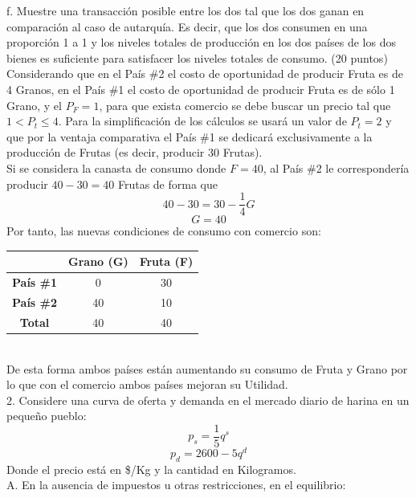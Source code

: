 \documentclass[12pt,dvipsnames]{article}
\begin{document}
f.	Muestre una transacción posible entre los dos tal que los dos ganan en comparación al caso de autarquía. Es decir, que los dos consumen en una proporción 1 a 1 y los niveles totales de producción en los dos países de los dos bienes es suficiente para satisfacer los niveles totales de consumo. (20 puntos)	\\

Considerando que en el País \#2 el costo de oportunidad de producir Fruta es de 4 Granos, en el País \#1 el costo de oportunidad de producir Fruta es de sólo 1 Grano, y  el $P_F = 1$, para que exista comercio se debe buscar un precio tal que $1 < P_t \leq 4$. Para la simplificación de los cálculos se usará un valor de $P_t = 2$ y que por la ventaja comparativa el País \#1 se dedicará exclusivamente a la producción de Frutas (es decir, producir 30 Frutas).\\
Si se considera la canasta de consumo donde $F = 40$, al País \#2 le correspondería producir $40 -30 = 40$ Frutas de forma que
$$40 - 30 = 30 - \frac{1}{4}G$$
$$G = 40$$ 
Por tanto, las nuevas condiciones de consumo con comercio son:\\
\begin{table}[h]
	\centering	
	\begin{tabular}{ccc}
		& \textbf{Grano (G)} & \textbf{Fruta (F)} \\ \hline
		\textbf{País \#1} & 0                 & 30                 \\
		\textbf{País \#2} & 40                 & 10                 \\ \hline
		\textbf{Total}    &   40               & 40                
	\end{tabular}
\end{table}\\

De esta forma ambos países están aumentando su consumo de Fruta y Grano por lo que con el comercio ambos países mejoran su Utilidad.\\

2. Considere una curva de oferta y demanda en el mercado diario de harina en un pequeño pueblo:
$$p_s=\frac{1}{5} q^s$$
$$p_d=2600-5q^d$$
Donde el precio está en \$/Kg y la cantidad en Kilogramos.\\

A.	En la ausencia de impuestos u otras restricciones, en el equilibrio:
\end{document}
